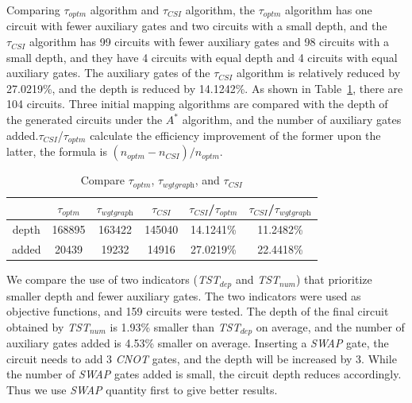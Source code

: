 \documentclass[runningheads]{llncs}
\begin{document}
Comparing $\tau_{optm}$ algorithm and $\tau_{CSI}$ algorithm, the $\tau_{optm}$ algorithm has one circuit with fewer auxiliary gates and two circuits with a small depth, and the $\tau_{CSI}$ algorithm has 99 circuits with fewer auxiliary gates and 98 circuits with a small depth, 
and they have 4 circuits with equal depth and 4 circuits with equal auxiliary gates. The auxiliary gates of the $\tau_{CSI}$ algorithm is relatively reduced by 27.0219\%, and the depth is reduced by 14.1242\%. As shown in Table~\ref{tab1}, there are 104 circuits. Three initial mapping algorithms are compared with the depth of the generated circuits under the $A^{*}$ algorithm, and the number of auxiliary gates added.$\tau_{CSI}$/$\tau_{optm}$  calculate the efficiency improvement of the former upon the latter, the formula is $(n_{optm}-n_{CSI})/n_{optm}$.
\begin{table}
	\begin{center}  
	\begin{tabular}{|c|c|c|c|c|c|}
	\hline
	    	&  $\tau_{optm}$ & $\tau_{\textit{wgtgraph}}$ &$\tau_{CSI}$& $\tau_{CSI}$/$\tau_{optm}$ & $\tau_{CSI}$/$\tau_{\textit{wgtgraph}}$\\
	\hline
	 depth 	 &	168895	&   163422	&  145040 	& 14.1241\%  &11.2482\%   \\
	\hline
	 added 	&	20439	&  19232 	&  14916 & 27.0219\% 	&  22.4418\%  \\
	\hline
	\end{tabular} 
	\end{center} 
	\caption{Compare $\tau_{optm}$, $\tau_{\textit{wgtgraph}}$, and $\tau_{CSI}$ }
	\label{tab1}
	\end{table}

	We compare the use of two indicators (\textit{TST$_{dep}$} and \textit{TST$_{num}$}) that prioritize smaller depth and fewer auxiliary gates. The two indicators were used as objective functions, and 159 circuits were tested. The depth of the final circuit obtained by \textit{TST$_{num}$} is 1.93\% smaller than \textit{TST$_{dep}$} on average, and the number of auxiliary gates added is 4.53\% smaller on average. Inserting a \textit{SWAP} gate, the circuit needs to add 3 \textit{CNOT} gates, and the depth will be increased by 3. While the number of \textit{SWAP} gates added is small, the circuit depth reduces accordingly. Thus we use \textit{SWAP} quantity first to give better results. 
\end{document}
